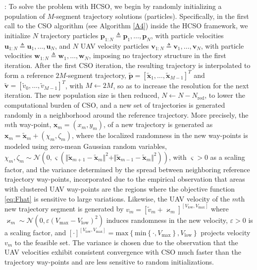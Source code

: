 \documentclass[12pt, draftcls, onecolumn]{IEEEtran}
\theoremstyle{plain}
\theoremstyle{definition}
\theoremstyle{remark}
\begin{document}
: To solve the problem with HCSO, we begin by randomly initializing a population of $M$-segment trajectory solutions (particles). Specifically, in the first call to the CSO algorithm \cite{CSO} (see Algorithm \ref{A4}) inside the HCSO framework, we initialize $N$ trajectory particles $\mathbf{p}_{1:N}{\triangleq}\mathbf{p}_{1},{\dots},\mathbf{p}_{N}$, with particle velocities $\mathbf{u}_{1:N}{\triangleq}\mathbf{u}_{1},{\dots},\mathbf{u}_{N}$, and $N$ UAV velocity particles $\mathbf{v}_{1:N}{\triangleq}\mathbf{v}_{1},{\dots},\mathbf{v}_{N}$, with particle velocities $\mathbf{w}_{1:N}{\triangleq}\mathbf{w}_{1},{\dots},\mathbf{w}_{N}$, imposing no trajectory structure in the first iteration. After the first CSO iteration, the resulting trajectory is interpolated to form a reference $2M$-segment trajectory, $\tilde{\mathbf{p}}{=}[\tilde{\mathbf{x}}_{1},{\dots},\tilde{\mathbf{x}}_{M{-}1}]^{T}$ and $\tilde{\mathbf{v}}{=}[\tilde{v}_{0},{\dots},\tilde{v}_{M{-}1}]^{T}$, with $M{\gets}2M$, so as to increase the resolution for the next iteration. The new population size is then reduced, $N{\gets}N{-}N_{\mathrm{red}}$, to lower the computational burden of CSO, and a new set of trajectories is generated randomly in a neighborhood around the reference trajectory. More precisely, the $m$th way-point, $\mathbf{x}_{m}{=}(x_{m},y_{m})$, of a new trajectory is generated as $\mathbf{x}_{m}{=}\tilde{\mathbf{x}}_{m}{+}(\chi_{m},\zeta_{m})$,
where the localized randomness in the new way-points is modeled using zero-mean Gaussian random variables, $\chi_{m},\zeta_{m}{\sim}\mathcal{N}\left(0,\varsigma\left(\Vert\tilde{\mathbf{x}}_{m{+}1}{-}\tilde{\mathbf{x}}_{m}\Vert^{2}{+}\Vert\tilde{\mathbf{x}}_{m{-}1}{-}\tilde{\mathbf{x}}_{m}\Vert^2\right)\right)$, with $\varsigma{>}0$ as a scaling factor, and the variance determined by the spread between neighboring reference trajectory way-points, incorporated due to the empirical observation that areas with clustered UAV way-points are the regions where the objective function \eqref{eq:Fhat} is sensitive to large variations. Likewise, the UAV velocity of the $m$th new trajectory segment is generated by $v_{m}{=}[\tilde{v}_{m}{+}\varkappa_{m}]^{[V_{\mathrm{low}},V_{\mathrm{max}}]}$
where $\varkappa_{m}{\sim}\mathcal{N}\left(0,\varepsilon\left(V_{\mathrm{max}}{-}V_{\mathrm{low}}\right)^{2}\right)$ induces randomness in the new velocity, $\varepsilon{>}0$ is a scaling factor, and $[\cdot]^{[V_{\mathrm{low}},V_{\mathrm{max}}]}{=}\mathrm{max}\left\{ \mathrm{min}\left\{\cdot,V_{\mathrm{max}}\right\},V_{\mathrm{low}}\right\}$ projects velocity $v_{m}$ to the feasible set. The variance is chosen due to the observation that the UAV velocities exhibit consistent convergence with CSO much faster than the trajectory way-points and are less sensitive to random initializations.
\end{document}

